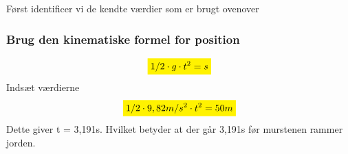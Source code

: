 Først identificer vi de kendte værdier som er brugt ovenover

\subsubsection{Brug den kinematiske formel for position}
\begin{equation*}
    \mathcolorbox{yellow}{1/2\cdot g\cdot t^{2}=s}
\end{equation*}
Indsæt værdierne
\begin{equation*}
    \mathcolorbox{yellow}{1/2\cdot9,82m/s^{2}\cdot t^{2}=50m}
\end{equation*}
Dette giver t = 3,191s. Hvilket betyder at der går 3,191s før murstenen rammer jorden.


